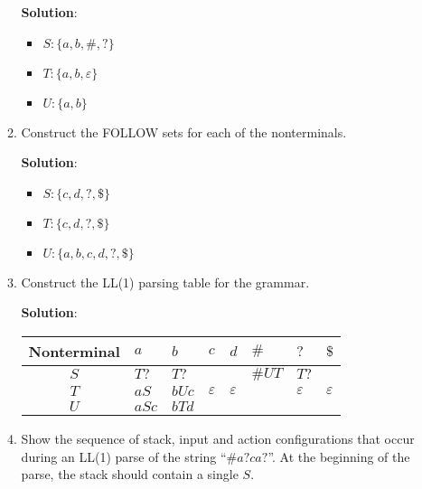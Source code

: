 \documentclass[11pt]{article}
\let\epsilon\varepsilon
\begin{document}
\begin{enumerate}
\begin{enumerate}
    \textbf{Solution}:
    \begin{itemize}
    \item $S: \{a, b, \#, ?\}$
    \item $T: \{a, b, \epsilon\}$
    \item $U: \{a, b\}$
    \end{itemize}
    
  \item Construct the FOLLOW sets for each of the nonterminals.

    \textbf{Solution}:
    \begin{itemize}
    \item $S: \{c, d, ?, \$\}$
    \item $T: \{c, d, ?, \$\}$
    \item $U: \{a, b, c, d, ?, \$\}$
    \end{itemize}

  \item Construct the LL(1) parsing table for the grammar.

    \textbf{Solution}:
    \begin{center}
      \begin{tabular}{c|C{3em}|C{3em}|C{3em}|C{3em}|C{3em}|C{3em}|C{3em}}
        Nonterminal & $a$ & $b$ & $c$ & $d$ & $\#$ & $?$ & $\$$ \\
        \hline
        $S$ & $T?$ & $T?$ & & & $\#UT$ & $T?$ & \\
        \hline
        $T$ & $aS$ & $bUc$ & $\epsilon$ & $\epsilon$ & & $\epsilon$ & $\epsilon$ \\
        \hline
        $U$ & $aSc$ & $bTd$ &  & & & & \\
      \end{tabular}
    \end{center}
    
  \item Show the sequence of stack, input and action configurations that occur during an LL(1) parse of the string ``$\# a?ca?$''. At the beginning of the parse, the stack should contain a single $S$.


\end{enumerate}
\end{enumerate}
\end{document}
